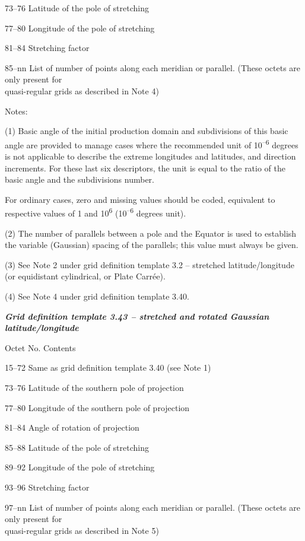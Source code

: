 73--76 Latitude of the pole of stretching

77--80 Longitude of the pole of stretching

81--84 Stretching factor

85--nn List of number of points along each meridian or parallel. (These octets are only present for\\
quasi-regular grids as described in Note 4)

Notes:

(1) Basic angle of the initial production domain and subdivisions of this basic angle are provided to manage cases where the recommended unit of 10\textsuperscript{--6} degrees is not applicable to describe the extreme longitudes and latitudes, and direction increments. For these last six descriptors, the unit is equal to the ratio of the basic angle and the subdivisions number.

For ordinary cases, zero and missing values should be coded, equivalent to respective values of 1 and 10\textsuperscript{6} (10\textsuperscript{--6} degrees unit).

(2) The number of parallels between a pole and the Equator is used to establish the variable (Gaussian) spacing of the parallels; this value must always be given.

(3) See Note 2 under grid definition template 3.2 -- stretched latitude/longitude (or equidistant cylindrical, or Plate Carrée).

(4) See Note 4 under grid definition template 3.40.

\emph{\textbf{Grid definition template 3.43 -- stretched and rotated Gaussian latitude/longitude}}

Octet No. Contents

15--72 Same as grid definition template 3.40 (see Note 1)

73--76 Latitude of the southern pole of projection

77--80 Longitude of the southern pole of projection

81--84 Angle of rotation of projection

85--88 Latitude of the pole of stretching

89--92 Longitude of the pole of stretching

93--96 Stretching factor

97--nn List of number of points along each meridian or parallel. (These octets are only present for\\
quasi-regular grids as described in Note 5)

